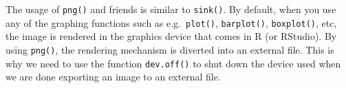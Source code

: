 \documentclass[
]{book}
\begin{document}
The usage of \texttt{png()} and friends is similar to \texttt{sink()}. By default, when
you use any of the graphing functions such as e.g.~\texttt{plot()}, \texttt{barplot()},
\texttt{boxplot()}, etc, the image is rendered in the graphics device that comes in
R (or RStudio). By using \texttt{png()}, the rendering mechanism is diverted into an
external file. This is why we need to use the function \texttt{dev.off()} to shut
down the device used when we are done exporting an image to an external file.

  
\end{document}
